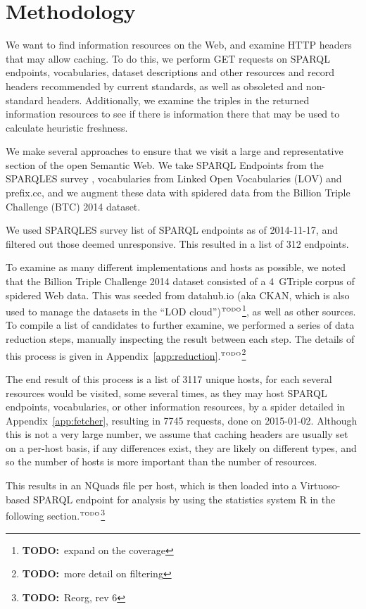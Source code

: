 \documentclass{llncs}
\newcommand{\todo}[1]{\ensuremath{^{\textrm{\tiny{TODO}\normalsize}}}\footnote{\textbf{TODO:}~#1}}
\begin{document}
\section{Methodology}
We want to find information resources on the Web, and examine HTTP
headers that may allow caching. To do this, we perform GET requests on
SPARQL endpoints, vocabularies, dataset descriptions and other
resources and record headers recommended by current standards, as well
as obsoleted and non-standard headers. Additionally, we examine the
triples in the returned information resources to see if there is
information there that may be used to calculate heuristic freshness.

We make several approaches to ensure that we visit a large and
representative section of the open Semantic Web. We take SPARQL
Endpoints from the SPARQLES survey \cite{buil2013sparql}, vocabularies
from Linked Open Vocabularies (LOV) \cite{lov2} and prefix.cc, and
we augment these data with spidered data from the Billion Triple
Challenge (BTC) 2014 \cite{btc-2014} dataset.

We used SPARQLES survey list of SPARQL endpoints as of 2014-11-17, and
filtered out those deemed unresponsive. This resulted in a
list of 312 endpoints.

To examine as many different implementations and hosts as possible, we
noted that the Billion Triple Challenge 2014 \cite{btc-2014} dataset
consisted of a 4~GTriple corpus of spidered Web data. This was seeded
from datahub.io (aka CKAN, which is also used to manage the datasets
in the ``LOD cloud'')\todo{expand on the coverage}, as well as other sources. To compile a list of
candidates to further examine, we performed a series of data reduction
steps, manually inspecting the result between each step. The details
of this process is given in Appendix~\ref{app:reduction}.\todo{more
  detail on filtering}

The end result of this process is a list of 3117 unique hosts, for
each several resources would be visited, some several times, as they
may host SPARQL endpoints, vocabularies, or other information
resources, by a spider detailed in Appendix~\ref{app:fetcher},
resulting in 7745 requests, done on 2015-01-02. Although this is not a
very large number, we assume that caching headers are usually set on a
per-host basis, if any differences exist, they are likely on different
types, and so the number of hosts is more important than the
number of resources.

This results in an NQuads file per host, which is then loaded into a
Virtuoso-based SPARQL endpoint for analysis by using the statistics
system R\cite{kn:r} in the following section.\todo{Reorg, rev 6}
\end{document}
